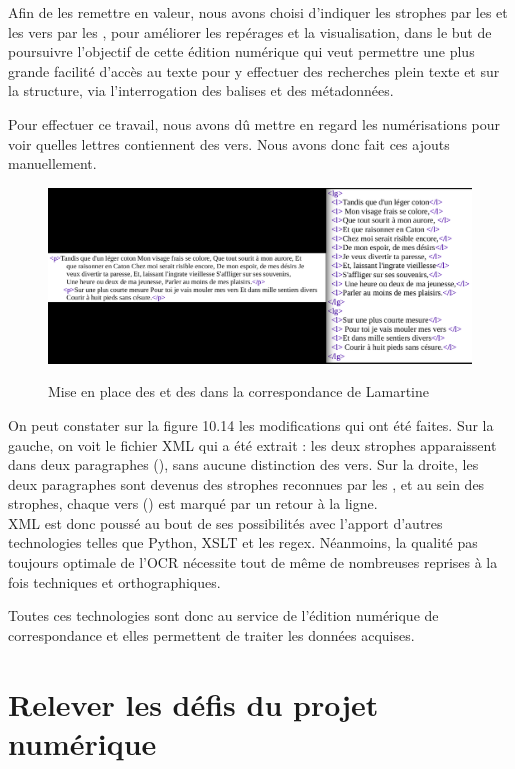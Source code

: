 Afin de les remettre en valeur, nous avons choisi d'indiquer les strophes par les  et les vers par les , pour améliorer les repérages et la visualisation, dans le but de poursuivre l'objectif de cette édition numérique qui veut permettre une plus grande facilité d'accès au texte pour y effectuer des recherches plein texte et sur la structure, via l'interrogation des balises et des métadonnées.

Pour effectuer ce travail, nous avons dû mettre en regard les numérisations pour voir quelles lettres contiennent des vers. Nous avons donc fait ces ajouts manuellement.
\begin{figure}[ht]
    \centering
    \caption{Mise en place des  et des  dans la correspondance de Lamartine}
    \includegraphics[width=16cm]{images/lamartineLG.png}
    \label{lamartineLG}
\end{figure}
On peut constater sur la figure 10.14 les modifications qui ont été faites. Sur la gauche, on voit le fichier XML qui a été extrait : les deux strophes apparaissent dans deux paragraphes (), sans aucune distinction des vers. Sur la droite, les deux paragraphes sont devenus des strophes reconnues par les , et au sein des strophes, chaque vers () est marqué par un retour à la ligne.\\

XML est donc poussé au bout de ses possibilités avec l'apport d'autres technologies telles que Python, XSLT et les regex. Néanmoins, la qualité pas toujours optimale de l'OCR nécessite tout de même de nombreuses reprises à la fois techniques et orthographiques. 

Toutes ces technologies sont donc au service de l'édition numérique de correspondance et elles permettent de traiter les données acquises.



\chapter{Relever les défis du projet numérique}

